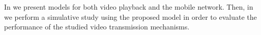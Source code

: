 In  we present models for both video playback and the mobile network.
Then, in  we perform a simulative study using the proposed model in order to evaluate the performance of the studied video transmission mechanisms.



 